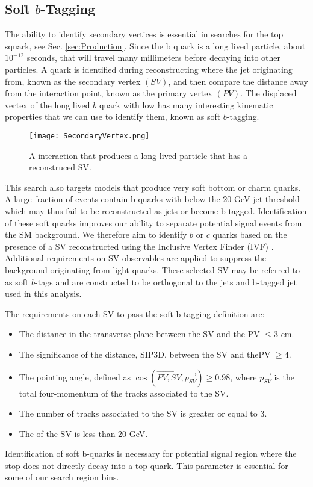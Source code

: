 \subsection{Soft $b$-Tagging}\label{SV}

The ability to identify secondary vertices is essential in searches for the top squark, see Sec. \ref{sec:Production}. Since the b quark is a long lived particle, about $10^{-12}$ seconds, that will travel many millimeters before decaying into other particles. A \B{} quark is identified during reconstructing where the jet originating from, known as the secondary vertex $(SV)$, and then compare the distance away from the interaction point, known as the primary vertex $(PV)$. The displaced vertex of the long lived $b$ quark with low \pt{} has many interesting kinematic properties that we can use to identify them, known as soft $b$-tagging. 

\begin{figure}
 	\centering
	\texttt{[image: SecondaryVertex.png]}
 	\caption[Secondary Vertex Diagram]{A interaction that produces a long lived particle that has a reconstruced SV.}
 	\label{SecondaryVertex} 
\end{figure}

This search also targets models that produce very soft bottom or charm quarks. A large fraction of events contain b quarks with \pt{} below the 20 GeV jet \pt{} threshold which may thus fail to be reconstructed as jets or become b-tagged. Identification of these soft quarks improves our ability to separate potential signal events from the SM background. We therefore aim to identify $b$ or $c$ quarks based on the presence of a SV reconstructed using the Inclusive Vertex Finder (IVF) \cite{noauthor_inclusivesecondaryvertexfinder_nodate}. Additional requirements on SV observables are applied to suppress the background originating from light quarks. These selected SV may be referred to as soft $b$-tags and are constructed to be orthogonal to the jets and b-tagged jet used in this analysis. 

The requirements on each SV to pass the soft b-tagging definition are:
\begin{itemize}
	 \item The distance in the transverse plane between the SV and the PV $\leq3$ cm.
	 \item The significance of the distance, SIP3D, between the SV and thePV $\geq4$.
	 \item The pointing angle, defined as $\cos(\overrightarrow{PV,SV},\overrightarrow{p_{SV}})\geq0.98$, where $\overrightarrow{p_{SV}}$ is the total four-momentum of the tracks associated to the SV. 
	 \item The number of tracks associated to the SV is greater or equal to 3.
	 \item The \pt{} of the SV is less than 20 GeV.
\end{itemize}
Identification of soft b-quarks is necessary for potential signal region where the stop does not directly decay into a top quark. This parameter is essential for some of our search region bins. 

